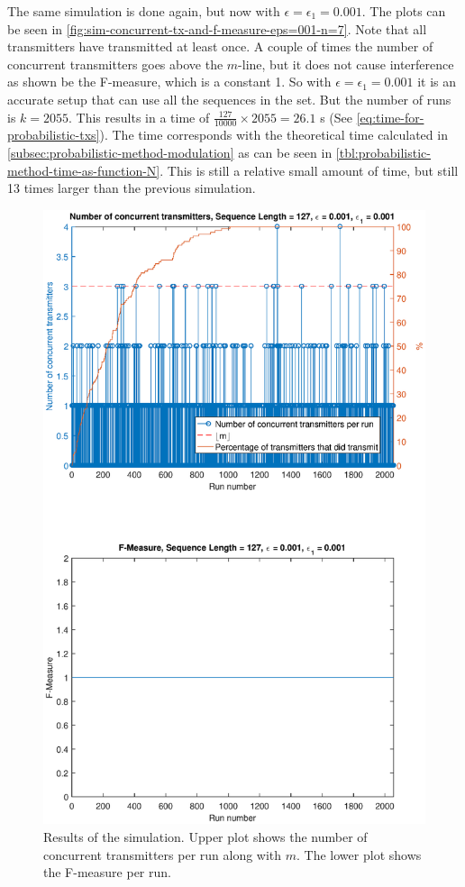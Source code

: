 The same simulation is done again, but now with $\epsilon = \epsilon_1 = 0.001$.
The plots can be seen in \autoref{fig:sim-concurrent-tx-and-f-measure-eps=001-n=7}.
Note that all transmitters have transmitted at least once.
A couple of times the number of concurrent transmitters goes above the $m$-line, but it does not cause interference as shown be the F-measure, which is a constant 1.
So with $\epsilon = \epsilon_1 = 0.001$ it is an accurate setup that can use all the sequences in the set.
But the number of runs is $k = 2055$.
This results in a time of $\frac{127}{10000} \times 2055 = 26.1$ s (See \autoref{eq:time-for-probabilistic-txs}).
The time corresponds with the theoretical time calculated in \autoref{subsec:probabilistic-method-modulation} as can be seen in \autoref{tbl:probabilistic-method-time-as-function-N}.
This is still a relative small amount of time, but still 13 times larger than the previous simulation.


\begin{figure}[tbp]
	\centering
	\includegraphics[width=\textwidth]{chapters/evaluation-chapters/simulation/sim-concurrent-tx-and-f-measure-eps=001-n=7.eps}
	\caption{Results of the simulation. Upper plot shows the number of concurrent transmitters per run along with $m$. The lower plot shows the F-measure per run.}
	\label{fig:sim-concurrent-tx-and-f-measure-eps=001-n=7}
\end{figure}

